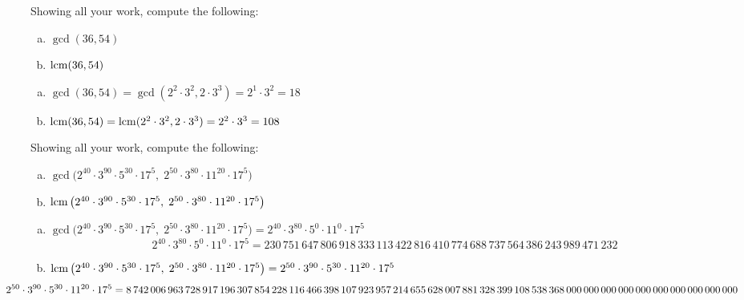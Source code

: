 \documentclass[12pt,letterpaper]{exam}
\begin{document}
\begin{questions}
\newpage
\question[5] Showing all your work, compute the following:
	\begin{enumerate}[(a)]
	\item $\gcd(36, 54)$
	\item $\operatorname{lcm}(36, 54)$
	\end{enumerate} \pspace

\sol 
\begin{enumerate}[(a)]
\item $\gcd(36, 54)= \gcd(2^2 \cdot 3^2, 2 \cdot 3^3)= 2^1 \cdot 3^2= 18$ \pspace
\item $\operatorname{lcm}(36, 54)= \operatorname{lcm}(2^2 \cdot 3^2, 2 \cdot 3^3)= 2^2 \cdot 3^3= 108$
\end{enumerate}



\newpage
\question[5] Showing all your work, compute the following:
	\begin{enumerate}[(a)]
	\item $\gcd \big(2^{40} \cdot 3^{90} \cdot 5^{30} \cdot 17^5,\; 2^{50} \cdot 3^{80} \cdot 11^{20} \cdot 17^5 \big)$ \par\vspace{0.3cm}
	\item $\operatorname{lcm} \big(2^{40} \cdot 3^{90} \cdot 5^{30} \cdot 17^5,\; 2^{50} \cdot 3^{80} \cdot 11^{20} \cdot 17^5 \big)$
	\end{enumerate} \pspace

\sol 
\begin{enumerate}[(a)]
\item $\gcd \big(2^{40} \cdot 3^{90} \cdot 5^{30} \cdot 17^5,\; 2^{50} \cdot 3^{80} \cdot 11^{20} \cdot 17^5 \big)= 2^{40} \cdot 3^{80} \cdot 5^0 \cdot 11^0 \cdot 17^5$ \pspace
	{\footnotesize
	\[
	2^{40} \cdot 3^{80} \cdot 5^0 \cdot 11^0 \cdot 17^5= 230\,751\,647\,806\,918\,333\,113\,422\,816\,410\,774\,688\,737\,564\,386\,243\,989\,471\,232
	\]} \pspace

\item $\operatorname{lcm} \big(2^{40} \cdot 3^{90} \cdot 5^{30} \cdot 17^5,\; 2^{50} \cdot 3^{80} \cdot 11^{20} \cdot 17^5 \big)= 2^{50} \cdot 3^{90} \cdot 5^{30} \cdot 11^{20} \cdot 17^5$
	{\tiny
	\[
	\hspace{-1.5cm} 2^{50} \cdot 3^{90} \cdot 5^{30} \cdot 11^{20} \cdot 17^5= 8\,742\,006\,963\,728\,917\,196\,307\,854\,228\,116\,466\,398\,107\,923\,957\,214\,655\,628\,007\,881\,328\,399\,108\,538\,368\,000\,000\,000\,000\,000\,000\,000\,000\,000\,000
	\]} \pspace
\end{enumerate}




\end{questions}
\end{document}
